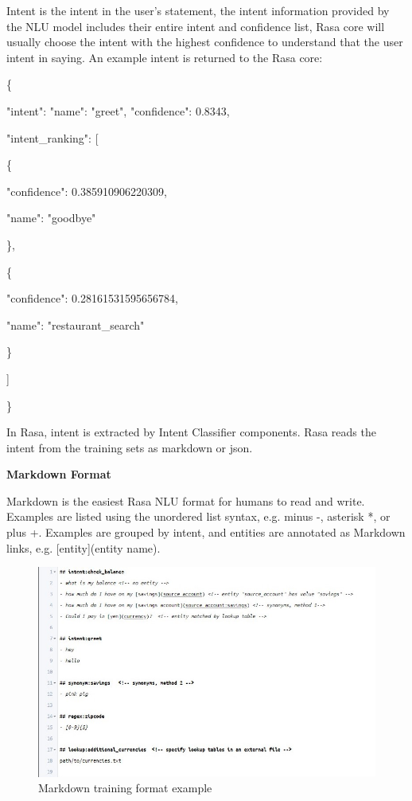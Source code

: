 
Intent is the intent in the user's statement, the intent information provided by the NLU model includes their entire intent and confidence list, Rasa core will usually choose the intent with the highest confidence to understand that the user intent in saying.
An example intent is returned to the Rasa core:

\{

    \quad"intent": {"name": "greet", "confidence": 0.8343},

    \quad"intent\_ranking": [

        \qquad\{

            \qquad\quad"confidence": 0.385910906220309,

            \qquad\quad"name": "goodbye"

        \qquad\},

        \qquad\{

            \qquad\quad"confidence": 0.28161531595656784,

            \qquad\quad"name": "restaurant\_search"

        \quad\}

    ]

\}

In Rasa, intent is extracted by Intent Classifier components. Rasa reads the intent from the training sets as markdown or json.

\textbf{Markdown Format}

Markdown is the easiest Rasa NLU format for humans to read and write. Examples are listed using the unordered list syntax, e.g. minus -, asterisk *, or plus +. Examples are grouped by intent, and entities are annotated as Markdown links, e.g. [entity](entity name).

\begin{figure}[h]
    \label{fig:markdownexample}
    \centering
    \includegraphics[width=1\textwidth]{Picture/markdownexample.jpg}
    \caption{Markdown training format example}
\end{figure}

